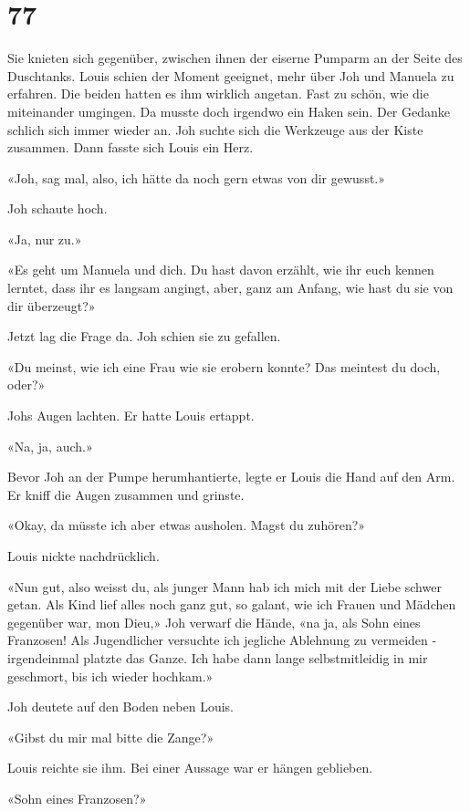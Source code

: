 \chapter{77}



Sie knieten sich gegenüber, zwischen ihnen der eiserne Pumparm an der
Seite des Duschtanks. Louis schien der Moment geeignet, mehr über Joh
und Manuela zu erfahren. Die beiden hatten es ihm wirklich angetan. Fast
zu schön, wie die miteinander umgingen. Da musste doch irgendwo ein
Haken sein. Der Gedanke schlich sich immer wieder an.
Joh suchte sich die Werkzeuge aus der Kiste zusammen. Dann fasste sich
Louis ein Herz.

«Joh, sag mal, also, ich hätte da noch gern etwas von dir gewusst.»

Joh schaute hoch.

«Ja, nur zu.»

«Es geht um Manuela und dich. Du hast davon erzählt, wie ihr euch
kennen lerntet, dass ihr es langsam angingt, aber, ganz am Anfang, wie hast du sie von dir
überzeugt?»

Jetzt lag die Frage da. Joh schien sie zu gefallen. 

«Du meinst, wie ich eine Frau wie sie erobern konnte? Das meintest du
doch, oder?»

Johs Augen lachten. Er hatte Louis ertappt.

«Na, ja, auch.»

Bevor Joh an der Pumpe herumhantierte, legte er Louis die Hand auf den Arm. 
Er kniff die Augen zusammen und grinste.

«Okay, da müsste ich aber etwas ausholen. Magst du zuhören?»

Louis nickte nachdrücklich.

«Nun gut, also weisst du, als junger Mann hab ich mich mit der Liebe
schwer getan. Als Kind lief alles noch ganz gut, so galant, wie ich
Frauen und Mädchen gegenüber war, mon Dieu,» Joh verwarf die Hände, «na
ja, als Sohn eines Franzosen! Als Jugendlicher versuchte ich jegliche Ablehnung zu vermeiden - 
irgendeinmal platzte das Ganze. Ich habe dann lange selbstmitleidig in mir geschmort, bis ich wieder hochkam.»

Joh deutete auf den Boden neben Louis.

«Gibst du mir mal bitte die Zange?»

Louis reichte sie ihm. Bei einer Aussage war er hängen geblieben.

«Sohn eines Franzosen?»

